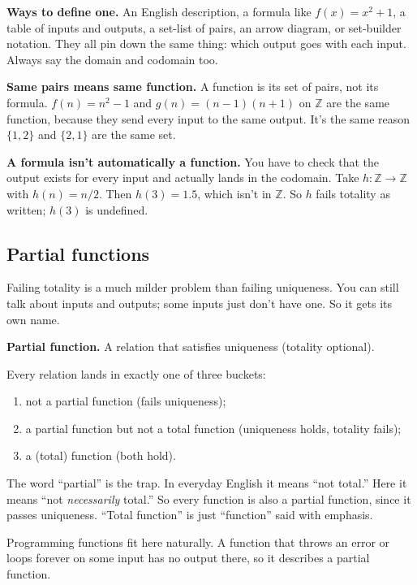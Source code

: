 \textbf{Ways to define one.} An English description, a formula like $f(x)=x^2+1$, a table of inputs and outputs, a set-list of pairs, an arrow diagram, or set-builder notation. They all pin down the same thing: which output goes with each input. Always say the domain and codomain too.

\textbf{Same pairs means same function.} A function is its set of pairs, not its formula. $f(n)=n^2-1$ and $g(n)=(n-1)(n+1)$ on $\mathbb{Z}$ are the same function, because they send every input to the same output. It's the same reason $\{1,2\}$ and $\{2,1\}$ are the same set.

\textbf{A formula isn't automatically a function.} You have to check that the output exists for every input and actually lands in the codomain. Take $h:\mathbb{Z}\to\mathbb{Z}$ with $h(n)=n/2$. Then $h(3)=1.5$, which isn't in $\mathbb{Z}$. So $h$ fails totality as written; $h(3)$ is undefined.

\subsection{Partial functions}

Failing totality is a much milder problem than failing uniqueness. You can still talk about inputs and outputs; some inputs just don't have one. So it gets its own name.

\begin{notebox}
\textbf{Partial function.} A relation that satisfies uniqueness (totality optional).

Every relation lands in exactly one of three buckets:
\begin{enumerate}
\item not a partial function (fails uniqueness);
\item a partial function but not a total function (uniqueness holds, totality fails);
\item a (total) function (both hold).
\end{enumerate}
\end{notebox}

The word ``partial'' is the trap. In everyday English it means ``not total.'' Here it means ``not \emph{necessarily} total.'' So every function is also a partial function, since it passes uniqueness. ``Total function'' is just ``function'' said with emphasis.

Programming functions fit here naturally. A function that throws an error or loops forever on some input has no output there, so it describes a partial function.

